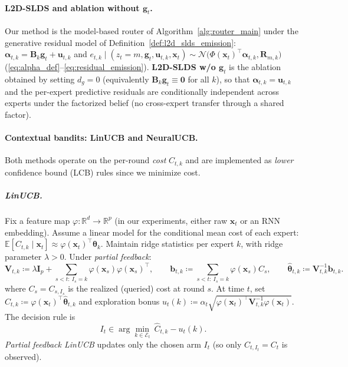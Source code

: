 \paragraph{L2D-SLDS and ablation without \(\mathbf{g}_t\).}
Our method is the model-based router of Algorithm~\ref{alg:router_main} under the generative residual
model of Definition~\ref{def:l2d_slds_emission}:
\(
\boldsymbol{\alpha}_{t,k}=\mathbf{B}_k\mathbf{g}_t+\mathbf{u}_{t,k}
\)
and
\(
e_{t,k}\mid(z_t=m,\mathbf{g}_t,\mathbf{u}_{t,k},\mathbf{x}_t)\sim
\mathcal{N}\!\big(\Phi(\mathbf{x}_t)^\top\boldsymbol{\alpha}_{t,k},\mathbf{R}_{m,k}\big)
\)
(\eqref{eq:alpha_def}--\eqref{eq:residual_emission}).
\textbf{L2D-SLDS w/o \(\mathbf{g}_t\)} is the ablation obtained by setting \(d_g=0\) (equivalently
\(\mathbf{B}_k\mathbf{g}_t\equiv \mathbf{0}\) for all \(k\)), so that
\(\boldsymbol{\alpha}_{t,k}=\mathbf{u}_{t,k}\) and the per-expert predictive residuals are conditionally
independent across experts under the factorized belief (no cross-expert transfer through a shared
factor).

\paragraph{Contextual bandits: LinUCB and NeuralUCB.}
Both methods operate on the per-round \emph{cost} \(C_{t,k}\) and are implemented as \emph{lower}
confidence bound (LCB) rules since we minimize cost.


\subparagraph{LinUCB.}
Fix a feature map \(\varphi:\mathbb{R}^d\to\mathbb{R}^p\) (in our experiments, either raw
\(\mathbf{x}_t\) or an RNN embedding).
Assume a linear model for the conditional mean cost of each expert:
\(
\mathbb{E}[C_{t,k}\mid \mathbf{x}_t]\approx \varphi(\mathbf{x}_t)^\top \boldsymbol{\theta}_k
\).
Maintain ridge statistics per expert \(k\), with ridge parameter \(\lambda>0\).
Under \emph{partial feedback}:
\[
\mathbf{V}_{t,k}\coloneqq \lambda \mathbf{I}_p + \sum_{s<t:\ I_s=k} \varphi(\mathbf{x}_s)\varphi(\mathbf{x}_s)^\top,
\qquad
\mathbf{b}_{t,k}\coloneqq \sum_{s<t:\ I_s=k} \varphi(\mathbf{x}_s)C_s,
\qquad
\widehat{\boldsymbol{\theta}}_{t,k}\coloneqq \mathbf{V}_{t,k}^{-1}\mathbf{b}_{t,k}.
\]
where \(C_s=C_{s,I_s}\) is the realized (queried) cost at round \(s\).  At time \(t\), set
\(
\widehat{C}_{t,k}\coloneqq \varphi(\mathbf{x}_t)^\top\widehat{\boldsymbol{\theta}}_{t,k}
\)
and exploration bonus
\(
u_t(k)\coloneqq \alpha_t\sqrt{\varphi(\mathbf{x}_t)^\top\mathbf{V}_{t,k}^{-1}\varphi(\mathbf{x}_t)}.
\)
The decision rule is
\[
I_t \in \arg\min_{k\in\mathcal{E}_t}\ \widehat{C}_{t,k}-u_t(k).
\]
\emph{Partial feedback LinUCB} updates only the chosen arm \(I_t\) (so only \(C_{t,I_t}=C_t\) is observed).

